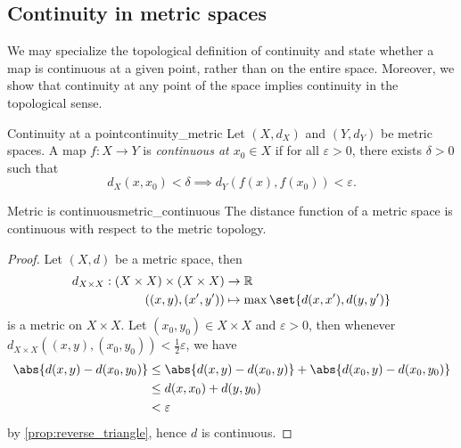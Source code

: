 \subsection{Continuity in metric spaces}
We may specialize the topological definition of continuity and state whether a map is continuous at a given point, rather than on the entire space. Moreover, we show that continuity at any point of the space implies continuity in the topological sense.
\begin{definition}{Continuity at a point}{continuity_metric}
    Let \((X,d_X)\) and \((Y, d_Y)\) be metric spaces. A map \(f : X \to Y\) is \emph{continuous at \(x_0 \in X\)} if for all \(\varepsilon > 0\), there exists \(\delta > 0\) such that
    \begin{equation*}
        d_X(x, x_0) < \delta \implies d_Y(f(x), f(x_0)) < \varepsilon.
    \end{equation*}
\end{definition}

\begin{proposition}{Metric is continuous}{metric_continuous}
    The distance function of a metric space is continuous with respect to the metric topology.
\end{proposition}
\begin{proof}
    Let \((X,d)\) be a metric space, then
    \begin{align*}
        d_{X\times X} : (X\times X) \times (X\times X) &\to \mathbb{R}\\
                                       ((x,y),(x',y')) &\mapsto \max{\set{d(x, x'), d(y, y')}}
    \end{align*}
    is a metric on \(X \times X\). Let \((x_0, y_0) \in X\times X\) and \(\varepsilon > 0\), then whenever \(d_{X\times X}((x,y), (x_0, y_0)) < \frac12 \varepsilon\), we have
    \begin{align*}
        \abs{d(x,y) - d(x_0, y_0)} &\leq \abs{d(x,y) - d(x_0, y)} + \abs{d(x_0,y) - d(x_0, y_0)}\\
                                   &\leq d(x,x_0) + d(y, y_0)\\
                                   &< \varepsilon
    \end{align*}
    by \cref{prop:reverse_triangle}, hence \(d\) is continuous.
\end{proof}

